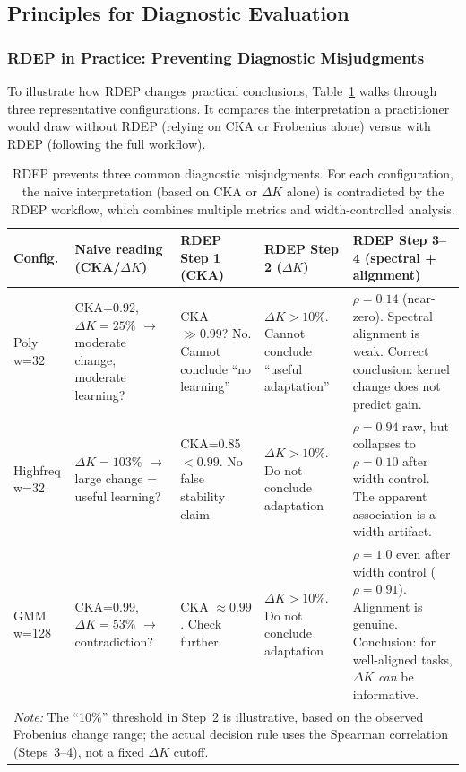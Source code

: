 \documentclass[twoside,11pt]{article}
\begin{document}
\vspace{4pt}
\subsection{Principles for Diagnostic Evaluation}\label{sec:principles}
\vspace{2pt}

\subsubsection{RDEP in Practice: Preventing Diagnostic Misjudgments}

To illustrate how RDEP changes practical conclusions, Table~\ref{tab:rdeep_cases} walks through three representative configurations. It compares the interpretation a practitioner would draw without RDEP (relying on CKA or Frobenius alone) versus with RDEP (following the full workflow).

\begin{table}[t]
\centering\small
\caption{RDEP prevents three common diagnostic misjudgments.  For each configuration, the naive interpretation (based on CKA or $\Delta K$ alone) is contradicted by the RDEP workflow, which combines multiple metrics and width-controlled analysis.}
\label{tab:rdeep_cases}
\begin{tabular}{p{2cm}p{2.2cm}p{2.2cm}p{2.2cm}p{2.2cm}}
\toprule
Config. & Naive reading (CKA/$\Delta K$) & RDEP Step 1 (CKA) & RDEP Step 2 ($\Delta K$) & RDEP Step 3--4 (spectral + alignment) \\
\midrule
Poly w=32 & CKA=0.92, $\Delta K=25\%$ $\rightarrow$ moderate change, moderate learning? & CKA $\gg 0.99$? No. Cannot conclude ``no learning'' & $\Delta K >10\%$. Cannot conclude ``useful adaptation'' & $\rho=0.14$ (near-zero). Spectral alignment is weak. Correct conclusion: kernel change does not predict gain. \\
\midrule
Highfreq w=32 & $\Delta K=103\%$ $\rightarrow$ large change = useful learning? & CKA=0.85 $<0.99$. No false stability claim & $\Delta K >10\%$. Do not conclude adaptation & $\rho=0.94$ raw, but collapses to $\rho=0.10$ after width control. The apparent association is a width artifact. \\
\midrule
GMM w=128 & CKA=0.99, $\Delta K=53\%$ $\rightarrow$ contradiction? & CKA $\approx 0.99$. Check further & $\Delta K >10\%$. Do not conclude adaptation & $\rho=1.0$ even after width control ($\rho=0.91$). Alignment is genuine. Conclusion: for well-aligned tasks, $\Delta K$ \emph{can} be informative. \\
\bottomrule
\multicolumn{5}{p{10.6cm}}{\small\textit{Note:} The ``10\%'' threshold in Step~2 is illustrative, based on the observed Frobenius change range; the actual decision rule uses the Spearman correlation (Steps~3--4), not a fixed $\Delta K$ cutoff.}
\end{tabular}
\end{table}
\end{document}
